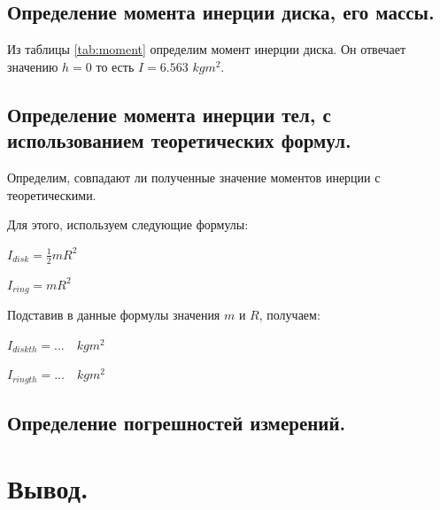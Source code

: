 \documentclass[12pt,a4paper]{article}
\begin{document}
\newpage
\begin{minipage}[h]{0.69\textwidth}
\end{minipage}
\newpage		

 \subsection{Определение момента инерции диска, его массы.}
Из таблицы \ref{tab:moment} определим момент инерции диска. Он отвечает значению $h=0$ то есть $I=6.563$ $kgm^2$.


      \subsection{Определение момента инерции тел, с использованием теоретических формул.}
		Определим, совпадают ли полученные значение моментов инерции с теоретическими.
		
		Для этого, используем следующие формулы:
		
		\newpage
		
		\begin{flushleft}
			\begin{spacing}{1.6}
				$ I_{disk} = \frac{1}{2}mR^2 $
				
				$ I_{ring} = mR^2 $
			\end{spacing}
		\end{flushleft}
		
		Подставив в данные формулы значения $ m $ и $ R $, получаем:		
		
		\begin{flushleft}
			\begin{spacing}{1.6}
				$ I_{disk th} =...  \quad kgm^2 $
				
				$ I_{ring th} =...  \quad kgm^2 $
			\end{spacing}
		\end{flushleft}


      \subsection{Определение погрешностей измерений.}	 
	
		 
		\newpage		 
		 
\section{Вывод.}
	
\end{document}
